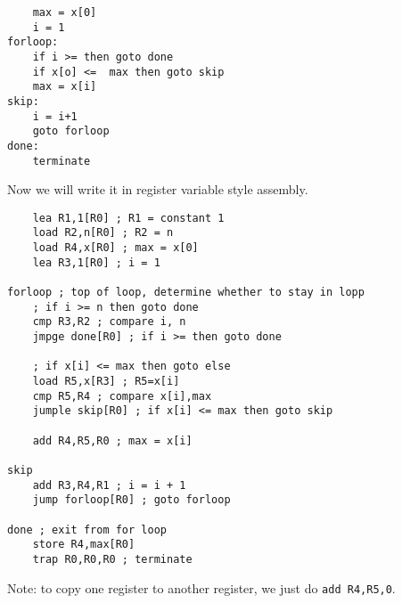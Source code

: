 \begin{verbatim}
    max = x[0]
    i = 1
forloop:
    if i >= then goto done
    if x[o] <=  max then goto skip
    max = x[i]
skip:
    i = i+1
    goto forloop
done:
    terminate
\end{verbatim}
Now we will write it in register variable style assembly.

\begin{verbatim}
    lea R1,1[R0] ; R1 = constant 1
    load R2,n[R0] ; R2 = n
    load R4,x[R0] ; max = x[0]
    lea R3,1[R0] ; i = 1

forloop ; top of loop, determine whether to stay in lopp
    ; if i >= n then goto done
    cmp R3,R2 ; compare i, n
    jmpge done[R0] ; if i >= then goto done

    ; if x[i] <= max then goto else
    load R5,x[R3] ; R5=x[i]
    cmp R5,R4 ; compare x[i],max
    jumple skip[R0] ; if x[i] <= max then goto skip

    add R4,R5,R0 ; max = x[i] 

skip
    add R3,R4,R1 ; i = i + 1
    jump forloop[R0] ; goto forloop

done ; exit from for loop
    store R4,max[R0]
    trap R0,R0,R0 ; terminate
\end{verbatim}

\begin{note}
	Note: to copy one register to another register, we just do \texttt{add R4,R5,0}.
\end{note}


